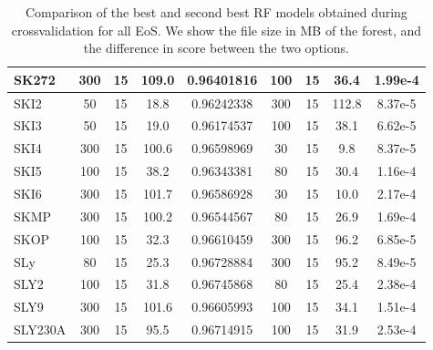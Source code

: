 \begin{table}[h]
\begin{tabular}{@{}lcccccccc@{}}
\multicolumn{1}{|l|}{SK272}     & 300   & 15    & 109.0 & \multicolumn{1}{c|}{0.96401816} & 100   & 15    & 36.4  & \multicolumn{1}{c|}{1.99e-4}       \\ \midrule
\multicolumn{1}{|l|}{SKI2}      & 50    & 15    & 18.8  & \multicolumn{1}{c|}{0.96242338} & 300   & 15    & 112.8 & \multicolumn{1}{c|}{8.37e-5}       \\ \midrule
\multicolumn{1}{|l|}{SKI3}      & 50    & 15    & 19.0  & \multicolumn{1}{c|}{0.96174537} & 100   & 15    & 38.1  & \multicolumn{1}{c|}{6.62e-5}       \\ \midrule
\multicolumn{1}{|l|}{SKI4}      & 300   & 15    & 100.6 & \multicolumn{1}{c|}{0.96598969} & 30    & 15    & 9.8   & \multicolumn{1}{c|}{8.37e-5}       \\ \midrule
\multicolumn{1}{|l|}{SKI5}      & 100   & 15    & 38.2  & \multicolumn{1}{c|}{0.96343381} & 80    & 15    & 30.4  & \multicolumn{1}{c|}{1.16e-4}       \\ \midrule
\multicolumn{1}{|l|}{SKI6}      & 300   & 15    & 101.7 & \multicolumn{1}{c|}{0.96586928} & 30    & 15    & 10.0  & \multicolumn{1}{c|}{2.17e-4}       \\ \midrule
\multicolumn{1}{|l|}{SKMP}      & 300   & 15    & 100.2 & \multicolumn{1}{c|}{0.96544567} & 80    & 15    & 26.9  & \multicolumn{1}{c|}{1.69e-4}       \\ \midrule
\multicolumn{1}{|l|}{SKOP}      & 100   & 15    & 32.3  & \multicolumn{1}{c|}{0.96610459} & 300   & 15    & 96.2  & \multicolumn{1}{c|}{6.85e-5}       \\ \midrule
\multicolumn{1}{|l|}{SLy}       & 80    & 15    & 25.3  & \multicolumn{1}{c|}{0.96728884} & 300   & 15    & 95.2  & \multicolumn{1}{c|}{8.49e-5}       \\ \midrule
\multicolumn{1}{|l|}{SLY2}      & 100   & 15    & 31.8  & \multicolumn{1}{c|}{0.96745868} & 80    & 15    & 25.4  & \multicolumn{1}{c|}{2.38e-4}       \\ \midrule
\multicolumn{1}{|l|}{SLY9}      & 300   & 15    & 101.6 & \multicolumn{1}{c|}{0.96605993} & 100   & 15    & 34.1  & \multicolumn{1}{c|}{1.51e-4}       \\ \midrule
SLY230A                         & 300   & 15    & 95.5  & 0.96714915                      & 100   & 15    & 31.9  & 2.53e-4                            \\ \bottomrule
\end{tabular}
\caption{Comparison of the best and second best RF models obtained during crossvalidation for all EoS. We show the file size in MB of the forest, and the difference in score between the two options.}
\label{tab:RFcross}
\end{table}

